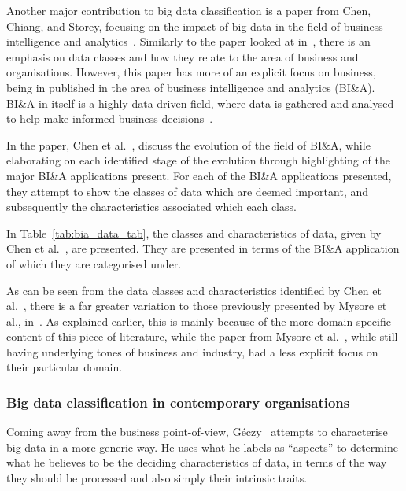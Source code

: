 \documentclass[a4paper,11pt]{article}
\begin{document}
Another major contribution to big data classification is a paper from Chen, Chiang, and Storey, focusing on the impact
of big data in the field of business intelligence and analytics~\cite{chen2012business}. Similarly to the paper looked
at in~, there is an emphasis on data classes and how they relate to the area of business and
organisations. However, this paper has more of an explicit focus on business, being in published in the area of business
intelligence and analytics (BI\&A). BI\&A in itself is a highly data driven field, where data is gathered and analysed
to help make informed business decisions~\cite{watson2009tutorial}.

In the paper, Chen et al.~\cite{chen2012business}, discuss the evolution of the field of BI\&A, while elaborating on
each identified stage of the evolution through highlighting of the major BI\&A applications present. For each of the
BI\&A applications presented, they attempt to show the classes of data which are deemed important, and subsequently the
characteristics associated which each class.

In Table~\ref{tab:bia_data_tab}, the classes and characteristics of data, given by Chen et
al.~\cite{chen2012business}, are presented. They are presented in terms of the BI\&A application of which they
are categorised under.

As can be seen from the data classes and characteristics identified by Chen et al.~\cite{chen2012business}, there is a
far greater variation to those previously presented by Mysore et al., in~\cite{bifet_mining_2013}. As explained earlier,
this is mainly because of the more domain specific content of this piece of literature, while the paper from Mysore et
al.~\cite{bifet_mining_2013}, while still having underlying tones of business and industry, had a less explicit focus on
their particular domain.





\subsubsection{Big data classification in contemporary organisations} %
\label{ssub:big_data_contemp}

Coming away from the business point-of-view, G\'eczy~\cite{geczy_big_2014} attempts to characterise big data in a more
generic way. He uses what he labels as ``aspects'' to determine what he believes to be the deciding characteristics of
data, in terms of the way they should be processed and also simply their intrinsic traits.
\end{document}
